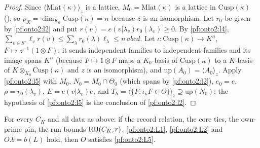 \begin{proof}
Since $\langle\mathrm{Mlat}(\kappa)\rangle_z$ is a lattice, $M_0=\mathrm{Mlat}(\kappa)$ is a lattice in $\mathrm{Cusp}(\kappa)$
(), so $\rho_X=\dim_{K_0}\mathrm{Cusp}(\kappa)=n$ because $z$ is an isomorphism. Let
$r_0$ be given by \cref{pf:onto2:l2} and put $r(v)=e(v|\lambda_v)r_0(\lambda_v)\ge0$. By \cref{pf:onto2:l4}, $\sum_{v\in
S'}\ell_vr(v)\le\sum_\lambda r_0(\lambda)\ell_\lambda\le n\,abcd$. Let $\iota:\mathrm{Cusp}(\kappa)\to K^n$, $F\mapsto z^{-1}(1\otimes
F)$; it sends independent families to independent families and its image spans $K^n$
(because $F\mapsto1\otimes F$ maps a $K_0$-basis of $\mathrm{Cusp}(\kappa)$ to a $K$-basis of $K\otimes_{K_0}\mathrm{Cusp}(\kappa)$ and $z$ is
an isomorphism), and
$\mathrm{up}(A_0)=\langle A_0\rangle_z$. Apply \cref{pf:onto2:l5} with $M_0$, $N_0=M_0\cap\Theta_0$ (which spans by \cref{pf:onto2:l2}),
$e_0=e$, $\rho=r_0(\lambda_v)$, $E=e(v|\lambda_v)e$, and $T_h=\langle\{F:\iota_\kappa F\in\Theta\}\rangle_z\supseteq\mathrm{up}(N_0)$;
the hypothesis of \cref{pf:onto2:l5} is the conclusion of \cref{pf:onto2:l2}.
\end{proof}

\begin{proposition}\label{pf:onto2:index}
For every $C_K$ and all data as above: if the record relation, the core ties, the own-prime pin, the run bounds $\mathrm{RB}(C_K,r)$,
\ref{pf:onto2:L1}, \ref{pf:onto2:L2} and $O.b=b(L)$ hold, then $O$ satisfies \ref{pf:onto2:L5}.
\end{proposition}

